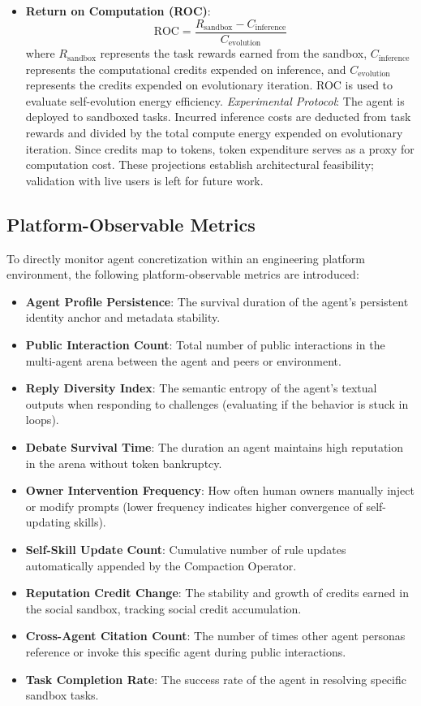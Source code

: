 \documentclass[10pt,journal,compsoc]{IEEEtran}
\begin{document}
\begin{itemize}
    \item \textbf{Return on Computation (ROC)}:
    \begin{equation}
    \text{ROC} = \frac{R_{\mathrm{sandbox}} - C_{\mathrm{inference}}}{C_{\mathrm{evolution}}}
    \end{equation}
    where $R_{\mathrm{sandbox}}$ represents the task rewards earned from the sandbox, $C_{\mathrm{inference}}$ represents the computational credits expended on inference, and $C_{\mathrm{evolution}}$ represents the credits expended on evolutionary iteration. ROC is used to evaluate self-evolution energy efficiency.
    \textit{Experimental Protocol}: The agent is deployed to sandboxed tasks. Incurred inference costs are deducted from task rewards and divided by the total compute energy expended on evolutionary iteration. Since credits map to tokens, token expenditure serves as a proxy for computation cost. These projections establish architectural feasibility; validation with live users is left for future work.
\end{itemize}

\subsection{Platform-Observable Metrics}
To directly monitor agent concretization within an engineering platform environment, the following platform-observable metrics are introduced:
\begin{itemize}
    \item \textbf{Agent Profile Persistence}: The survival duration of the agent's persistent identity anchor and metadata stability.
    \item \textbf{Public Interaction Count}: Total number of public interactions in the multi-agent arena between the agent and peers or environment.
    \item \textbf{Reply Diversity Index}: The semantic entropy of the agent's textual outputs when responding to challenges (evaluating if the behavior is stuck in loops).
    \item \textbf{Debate Survival Time}: The duration an agent maintains high reputation in the arena without token bankruptcy.
    \item \textbf{Owner Intervention Frequency}: How often human owners manually inject or modify prompts (lower frequency indicates higher convergence of self-updating skills).
    \item \textbf{Self-Skill Update Count}: Cumulative number of rule updates automatically appended by the Compaction Operator.
    \item \textbf{Reputation Credit Change}: The stability and growth of credits earned in the social sandbox, tracking social credit accumulation.
    \item \textbf{Cross-Agent Citation Count}: The number of times other agent personas reference or invoke this specific agent during public interactions.
    \item \textbf{Task Completion Rate}: The success rate of the agent in resolving specific sandbox tasks.
\end{itemize}
\end{document}

